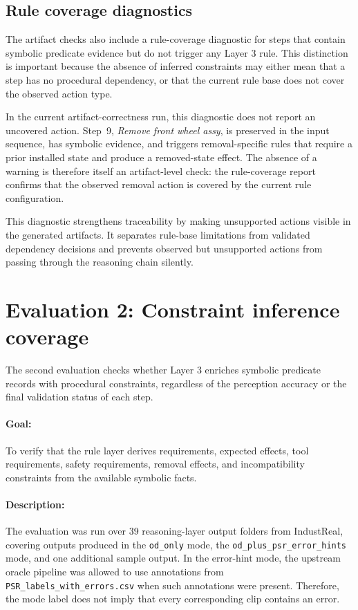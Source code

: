 \subsection{Rule coverage diagnostics}
\label{sec:evaluation-rule-coverage-diagnostics}

The artifact checks also include a rule-coverage diagnostic for steps that contain symbolic predicate evidence but do not trigger any Layer 3 rule. This distinction is important because the absence of inferred constraints may either mean that a step has no procedural dependency, or that the current rule base does not cover the observed action type.

In the current artifact-correctness run, this diagnostic does not report an uncovered action. Step~9, \textit{Remove front wheel assy}, is preserved in the input sequence, has symbolic evidence, and triggers removal-specific rules that require a prior installed state and produce a removed-state effect. The absence of a warning is therefore itself an artifact-level check: the rule-coverage report confirms that the observed removal action is covered by the current rule configuration.

This diagnostic strengthens traceability by making unsupported actions visible in the generated artifacts. It separates rule-base limitations from validated dependency decisions and prevents observed but unsupported actions from passing through the reasoning chain silently.

\section{Evaluation 2: Constraint inference coverage}
\label{sec:evaluation-constraint-coverage}

The second evaluation checks whether Layer 3 enriches symbolic predicate records
with procedural constraints, regardless of the perception accuracy or the final validation status of each step. 

\paragraph{Goal:}
To verify that the rule layer derives requirements, expected effects, tool requirements, safety requirements, removal effects, and incompatibility constraints from the available symbolic facts. 

\paragraph{Description:}
The evaluation was run over 39 reasoning-layer output folders from IndustReal, covering outputs produced in the \texttt{od\_only} mode, the \texttt{od\_plus\_psr\_error\_hints} mode, and one additional sample output. In the error-hint mode, the upstream oracle pipeline was allowed to use annotations from \texttt{PSR\_labels\_with\_errors.csv} when such annotations were present. Therefore, the mode label does not imply that every corresponding clip contains an error.

